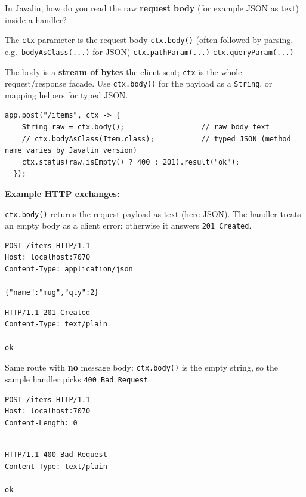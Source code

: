 \question[4]
In Javalin, how do you read the raw \textbf{request body} (for example JSON as text) inside a handler?
\begin{choices}
  \choice The \texttt{ctx} parameter is the request body
  \CorrectChoice \texttt{ctx.body()} (often followed by parsing, e.g.\ \texttt{bodyAsClass(...)} for JSON)
  \choice \texttt{ctx.pathParam(...)}
  \choice \texttt{ctx.queryParam(...)}
\end{choices}
\begin{solution}
  The body is a \textbf{stream of bytes} the client sent; \texttt{ctx} is the whole request/response facade. Use \texttt{ctx.body()} for the payload as a \texttt{String}, or mapping helpers for typed JSON.

  \begin{lstlisting}[style=java]
  app.post("/items", ctx -> {
    String raw = ctx.body();                  // raw body text
    // ctx.bodyAsClass(Item.class);           // typed JSON (method name varies by Javalin version)
    ctx.status(raw.isEmpty() ? 400 : 201).result("ok");
  });
  \end{lstlisting}

  \noindent\textbf{Example HTTP exchanges:}\par
  \noindent \texttt{ctx.body()} returns the request payload as text (here JSON). The handler treats an empty body as a client error; otherwise it answers \texttt{201~Created}.\par
  \begin{httpexchange}
\begin{lstlisting}[style=http]
POST /items HTTP/1.1
Host: localhost:7070
Content-Type: application/json

{"name":"mug","qty":2}
\end{lstlisting}
\httpmidarrows
\begin{lstlisting}[style=http]
HTTP/1.1 201 Created
Content-Type: text/plain

ok
\end{lstlisting}
  \end{httpexchange}

  \noindent Same route with \textbf{no} message body: \texttt{ctx.body()} is the empty string, so the sample handler picks \texttt{400~Bad Request}.\par
  \begin{httpexchange}
\begin{lstlisting}[style=http]
POST /items HTTP/1.1
Host: localhost:7070
Content-Length: 0


\end{lstlisting}
\httpmidarrows
\begin{lstlisting}[style=http]
HTTP/1.1 400 Bad Request
Content-Type: text/plain

ok
\end{lstlisting}
  \end{httpexchange}
\end{solution}

